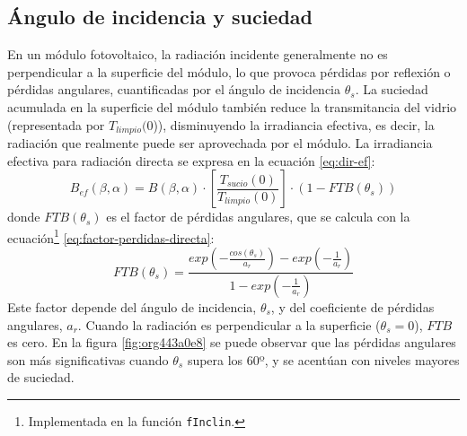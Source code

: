 \subsection{Ángulo de incidencia y suciedad}
\label{sec:org8d0c3bc}
\label{subsec-angulo-incidencia-suciedad}
En un módulo fotovoltaico, la radiación incidente generalmente no es perpendicular a la superficie del módulo, lo que provoca pérdidas por reflexión o pérdidas angulares, cuantificadas por el ángulo de incidencia \(\theta_s\). La suciedad acumulada en la superficie del módulo también reduce la transmitancia del vidrio (representada por \(T_{limpio}(0\))), disminuyendo la irradiancia efectiva, es decir, la radiación que realmente puede ser aprovechada por el módulo.
La irradiancia efectiva para radiación directa se expresa en la ecuación \ref{eq:dir-ef}:
\begin{equation}
B_{ef}(\beta ,\alpha)=B(\beta ,\alpha)\cdot [\frac{T_{sucio}(0)}{T_{limpio}(0)}]\cdot (1-FTB(\theta_s))
\label{eq:dir-ef}
\end{equation}
donde \(FTB(\theta_s)\) es el factor de pérdidas angulares, que se calcula con la ecuación\footnote{Implementada en la función \texttt{fInclin}.} \ref{eq:factor-perdidas-directa}: 
\begin{equation}
FTB(\theta_s)=\frac{exp(-\frac{cos(\theta_s)}{a_r})-exp(-\frac{1}{a_r})}{1-exp(-\frac{1}{a_r})}
\label{eq:factor-perdidas-directa}
\end{equation}
Este factor depende del ángulo de incidencia, \(\theta_s\), y del coeficiente de pérdidas angulares, \(a_r\). Cuando la radiación es perpendicular a la superficie (\(\theta_s=0\)), \(FTB\) es cero. En la figura \ref{fig:org443a0e8} se puede observar que las pérdidas angulares son más significativas cuando \(\theta_s\) supera los 60º, y se acentúan con niveles mayores de suciedad.
